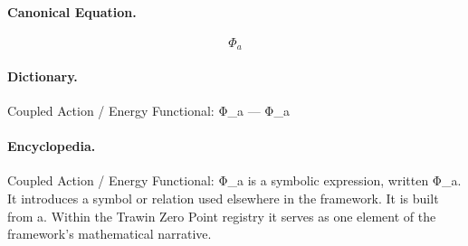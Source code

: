 \paragraph{Canonical Equation.}
\[
\Phi_a
\]

\paragraph{Dictionary.}
Coupled Action / Energy Functional: Φ\_a — Φ\_a

\paragraph{Encyclopedia.}
Coupled Action / Energy Functional: Φ\_a is a symbolic expression, written Φ\_a. It introduces a symbol or relation used elsewhere in the framework. It is built from a. Within the Trawin Zero Point registry it serves as one element of the framework's mathematical narrative.
